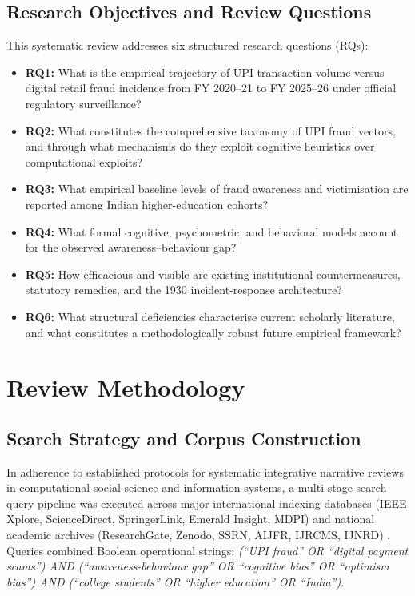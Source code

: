 \documentclass[journal,10pt,twocolumn]{IEEEtran}
\begin{document}
\subsection{Research Objectives and Review Questions}
This systematic review addresses six structured research questions (RQs):
\begin{itemize}
    \item \textbf{RQ1:} What is the empirical trajectory of UPI transaction volume versus digital retail fraud incidence from FY 2020--21 to FY 2025--26 under official regulatory surveillance?
    \item \textbf{RQ2:} What constitutes the comprehensive taxonomy of UPI fraud vectors, and through what mechanisms do they exploit cognitive heuristics over computational exploits?
    \item \textbf{RQ3:} What empirical baseline levels of fraud awareness and victimisation are reported among Indian higher-education cohorts?
    \item \textbf{RQ4:} What formal cognitive, psychometric, and behavioral models account for the observed awareness--behaviour gap?
    \item \textbf{RQ5:} How efficacious and visible are existing institutional countermeasures, statutory remedies, and the 1930 incident-response architecture?
    \item \textbf{RQ6:} What structural deficiencies characterise current scholarly literature, and what constitutes a methodologically robust future empirical framework?
\end{itemize}

\section{Review Methodology}

\subsection{Search Strategy and Corpus Construction}
In adherence to established protocols for systematic integrative narrative reviews in computational social science and information systems, a multi-stage search query pipeline was executed across major international indexing databases (IEEE Xplore, ScienceDirect, SpringerLink, Emerald Insight, MDPI) and national academic archives (ResearchGate, Zenodo, SSRN, AIJFR, IJRCMS, IJNRD) \cite{cochran1977, kothari2019}. Queries combined Boolean operational strings: \textit{(``UPI fraud'' OR ``digital payment scams'') AND (``awareness-behaviour gap'' OR ``cognitive bias'' OR ``optimism bias'') AND (``college students'' OR ``higher education'' OR ``India'')}.
\end{document}
